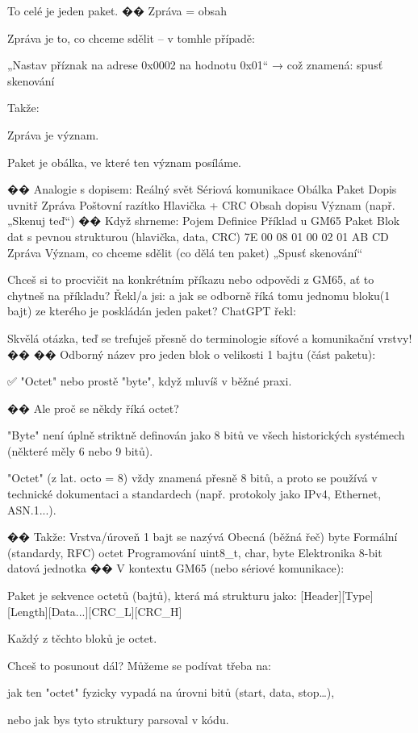 To celé je jeden paket.
�� Zpráva = obsah

    Zpráva je to, co chceme sdělit – v tomhle případě:

        „Nastav příznak na adrese 0x0002 na hodnotu 0x01“ → což znamená: spusť skenování

Takže:

    Zpráva je význam.

    Paket je obálka, ve které ten význam posíláme.

�� Analogie s dopisem:
Reálný svět	Sériová komunikace
Obálka	Paket
Dopis uvnitř	Zpráva
Poštovní razítko	Hlavička + CRC
Obsah dopisu	Význam (např. „Skenuj teď“)
�� Když shrneme:
Pojem	Definice	Příklad u GM65
Paket	Blok dat s pevnou strukturou (hlavička, data, CRC)	7E 00 08 01 00 02 01 AB CD
Zpráva	Význam, co chceme sdělit (co dělá ten paket)	„Spusť skenování“

Chceš si to procvičit na konkrétním příkazu nebo odpovědi z GM65, ať to chytneš na příkladu?
Řekl/a jsi:
a jak se odborně říká tomu jednomu bloku(1 bajt) ze kterého je poskládán jeden paket?
ChatGPT řekl:

Skvělá otázka, teď se trefuješ přesně do terminologie síťové a komunikační vrstvy! ��
�� Odborný název pro jeden blok o velikosti 1 bajtu (část paketu):

    ✅ "Octet"
    nebo prostě "byte", když mluvíš v běžné praxi.

�� Ale proč se někdy říká octet?

    "Byte" není úplně striktně definován jako 8 bitů ve všech historických systémech (některé měly 6 nebo 9 bitů).

    "Octet" (z lat. octo = 8) vždy znamená přesně 8 bitů, a proto se používá v technické dokumentaci a standardech (např. protokoly jako IPv4, Ethernet, ASN.1...).

�� Takže:
Vrstva/úroveň	1 bajt se nazývá
Obecná (běžná řeč)	byte
Formální (standardy, RFC)	octet
Programování	uint8_t, char, byte
Elektronika	8-bit datová jednotka
�� V kontextu GM65 (nebo sériové komunikace):

    Paket je sekvence octetů (bajtů), která má strukturu jako:
    [Header][Type][Length][Data...][CRC_L][CRC_H]

Každý z těchto bloků je octet.

Chceš to posunout dál? Můžeme se podívat třeba na:

    jak ten "octet" fyzicky vypadá na úrovni bitů (start, data, stop…),

    nebo jak bys tyto struktury parsoval v kódu.

